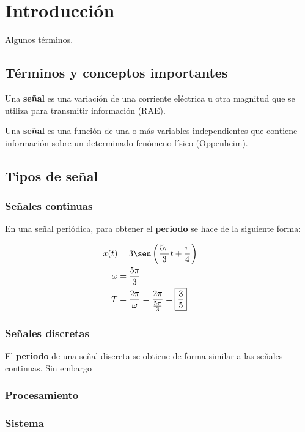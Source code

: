 \documentclass[a4paper]{book}
\begin{document}
\section{Introducción}

Algunos términos.
\subsection{Términos y conceptos importantes}
Una \textbf{señal} es una variación de una corriente eléctrica u otra magnitud que se utiliza para transmitir información (RAE).

Una \textbf{señal} es una función de una o más variables independientes que contiene información sobre un determinado fenómeno físico (Oppenheim).

\subsection{Tipos de señal} \vspace{\parskip}

\subsubsection{Señales continuas}

En una señal periódica, para obtener el \textbf{periodo} se hace de la siguiente forma:

\begin{align*}
x(t) &= 3 \sen \left( \frac{5\pi}{3}t + \frac{\pi}{4} \right) \qquad \\
\omega &= \frac{5\pi}{3}\\
	T &= \frac{2\pi}{\omega} = \frac{2\pi}{\frac{5\pi}{3}} = \boxed{\frac{3}{5}}
\end{align*}

\subsubsection{Señales discretas}

El \textbf{periodo} de una señal discreta se obtiene de forma similar a las señales continuas. Sin embargo 

 
\subsubsection{Procesamiento}

\subsubsection{Sistema}
\end{document}
